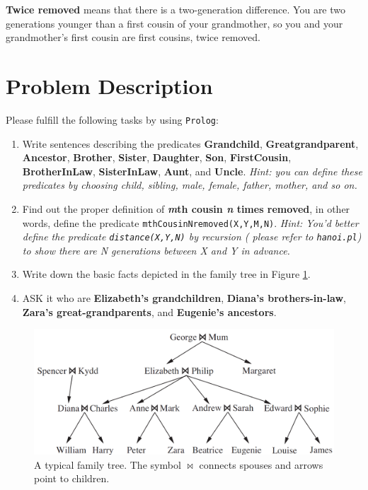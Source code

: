 ﻿\documentclass[a4paper, 11pt]{article}
\begin{document}
\textbf{Twice removed} means that there is a two-generation difference. You are two generations younger than a first cousin of your grandmother, so you and your grandmother's first cousin are first cousins, twice removed.
\section{Problem Description}
Please fulfill the following tasks by using \texttt{Prolog}:
\begin{enumerate}
\item Write sentences describing the predicates \textbf{Grandchild}, \textbf{Greatgrandparent}, \textbf{Ancestor}, \textbf{Brother}, \textbf{Sister}, \textbf{Daughter}, \textbf{Son}, \textbf{FirstCousin}, \textbf{BrotherInLaw}, \textbf{SisterInLaw}, \textbf{Aunt}, and \textbf{Uncle}. \emph{Hint: you can define these predicates by choosing child, sibling, male, female, father, mother, and so on. }
\item Find out the proper definition of \textbf{\emph{m}th cousin \emph{n} times removed}, in other words, define the predicate \texttt{mthCousinNremoved(X,Y,M,N)}. \emph{Hint: You'd better define the predicate \texttt{distance(X,Y,N)} by recursion ( please refer to \texttt{hanoi.pl}) to show there are N generations between X and Y in advance.}

\item Write down the basic facts depicted in the family tree in Figure \ref{fig:family}.

\item ASK it who are \textbf{Elizabeth’s grandchildren}, \textbf{Diana’s brothers-in-law}, \textbf{Zara’s great-grandparents}, and \textbf{Eugenie’s ancestors}.
\end{enumerate}

\begin{figure}[h]
  \centering
  \includegraphics[width=15cm]{Pic/family}

  \label{fig:family}
  \caption{A typical family tree. The symbol $\bowtie$ connects spouses and arrows point to children.}
\end{figure}
\end{document}
